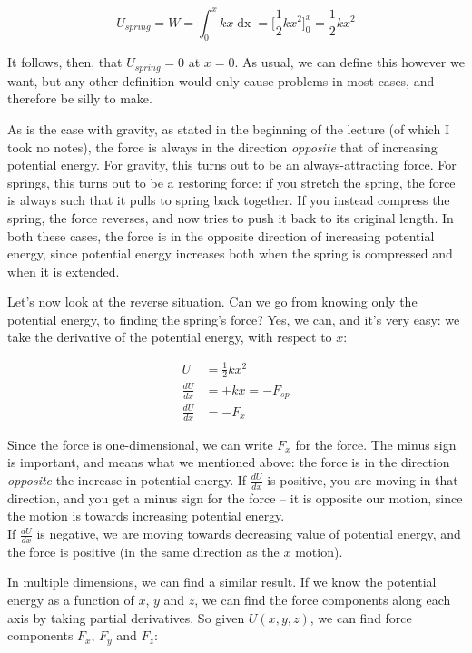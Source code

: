 \documentclass[12pt,a4paper]{report}
\begin{document}
\begin{equation}
U_{spring} = W = \int_0^x k x \mathop{dx} = \Big[\frac{1}{2} k x^2\Big]_0^x = \frac{1}{2} k x^2
\end{equation}

It follows, then, that $U_{spring} = 0$ at $x = 0$. As usual, we can define this however we want, but any other definition would only cause problems in most cases, and therefore be silly to make.

As is the case with gravity, as stated in the beginning of the lecture (of which I took no notes), the force is always in the direction \emph{opposite} that of increasing potential energy. For gravity, this turns out to be an always-attracting force. For springs, this turns out to be a restoring force: if you stretch the spring, the force is always such that it pulls to spring back together. If you instead compress the spring, the force reverses, and now tries to push it back to its original length. In both these cases, the force is in the opposite direction of increasing potential energy, since potential energy increases both when the spring is compressed and when it is extended.

Let's now look at the reverse situation. Can we go from knowing only the potential energy, to finding the spring's force? Yes, we can, and it's very easy: we take the derivative of the potential energy, with respect to $x$:

\begin{align}
U &= \frac{1}{2} k x^2\\
\frac{dU}{dx} &= + k x = - F_{sp}\\
\frac{dU}{dx} &= -F_x
\end{align}

Since the force is one-dimensional, we can write $F_x$ for the force. The minus sign is important, and means what we mentioned above: the force is in the direction \emph{opposite} the increase in potential energy. If $\frac{dU}{dx}$ is positive, you are moving in that direction, and you get a minus sign for the force -- it is opposite our motion, since the motion is towards increasing potential energy.\\
If $\frac{dU}{dx}$ is negative, we are moving towards decreasing value of potential energy, and the force is positive (in the same direction as the $x$ motion).

In multiple dimensions, we can find a similar result. If we know the potential energy as a function of $x$, $y$ and $z$, we can find the force components along each axis by taking partial derivatives. So given $U(x, y, z)$, we can find force components $F_x$, $F_y$ and $F_z$:
\end{document}
